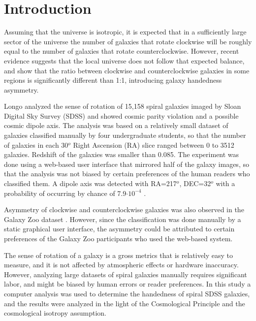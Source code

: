 \documentclass[times,twocolumn]{article}
\begin{document}



\section{Introduction}
\label{introduction}

Assuming that the universe is isotropic, it is expected that in a sufficiently large sector of the universe the number of galaxies that rotate clockwise will be roughly equal to the number of galaxies that rotate counterclockwise. However, recent evidence suggests that the local universe does not follow that expected balance, and show that the ratio between clockwise and counterclockwise galaxies in some regions is significantly different than 1:1, introducing galaxy handedness asymmetry.

Longo \citep{Lon11} analyzed the sense of rotation of 15,158 spiral galaxies imaged by Sloan Digital Sky Survey (SDSS) and showed cosmic parity violation and a possible cosmic dipole axis. The analysis was based on a relatively small dataset of galaxies classified manually by four undergraduate students, so that the number of galaxies in each 30$^o$ Right Ascension (RA) slice ranged between 0 to 3512 galaxies. Redshift of the galaxies was smaller than 0.085. The experiment was done using a web-based user interface that mirrored half of the galaxy images, so that the analysis was not biased by certain preferences of the human readers who classified them. A dipole axis was detected with RA=217$^o$, DEC=32$^o$ with a probability of occurring by chance of 7.9$\cdot10^{-4}$ \citep{Lon11}.

Asymmetry of clockwise and counterclockwise galaxies was also observed in the Galaxy Zoo dataset \citep{Lin10}. However, since the classification was done manually by a static graphical user interface, the asymmetry could be attributed to certain preferences of the Galaxy Zoo participants who used the web-based system.

The sense of rotation of a galaxy is a gross metrics that is relatively easy to measure, and it is not affected by atmospheric effects or hardware inaccuracy. However, analyzing large datasets of spiral galaxies manually requires significant labor, and might be biased by human errors or reader preferences. In this study a computer analysis was used to determine the handedness of spiral SDSS galaxies, and the results were analyzed in the light of the Cosmological Principle and the cosmological isotropy assumption.
\end{document}
